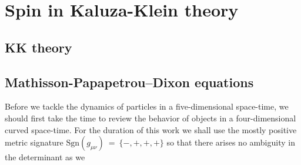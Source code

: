 \chapter{Spin in Kaluza-Klein theory}
\section{KK theory}
\section{Mathisson-Papapetrou–Dixon equations}\label{sec:MPDEquations}
Before we tackle the dynamics of particles in a five-dimensional space-time, we should first take the time to review the behavior of objects in a four-dimensional curved space-time. For the duration of this work we shall use the mostly positive metric signature $\mathrm{Sgn}(g_{\mu\nu})~=~\{-,+,+,+\}$ so that there arises no ambiguity in the determinant as we 